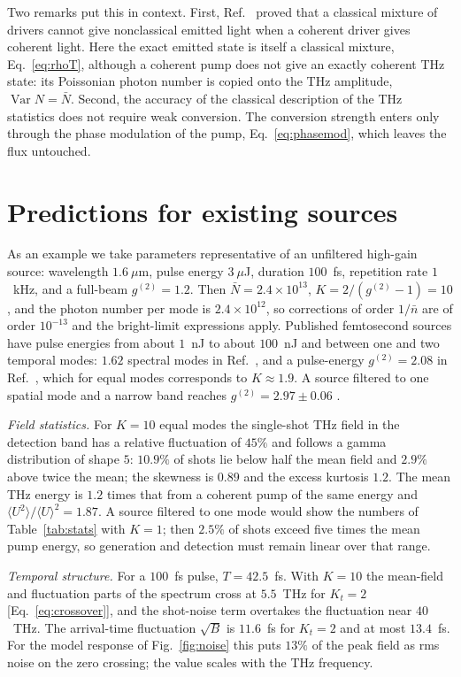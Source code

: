 \documentclass[aps,pra,reprint,superscriptaddress,amsmath,amssymb,floatfix]{revtex4-2}
\newcommand{\nbar}{\bar n}
\newcommand{\Nbar}{\bar N}
\newcommand{\Var}{\operatorname{Var}}
\begin{document}
Two remarks put this in context. First, Ref.~\cite{gothelf2026} proved that a
classical mixture of drivers cannot give nonclassical emitted light when a
coherent driver gives coherent light. Here the exact emitted state is itself
a classical mixture, Eq.~\eqref{eq:rhoT}, although a coherent pump does not
give an exactly coherent THz state: its Poissonian photon number is copied
onto the THz amplitude, $\Var N=\Nbar$. Second, the accuracy of the classical
description of the THz statistics does not require weak conversion. The
conversion strength enters only through the phase modulation of the pump,
Eq.~\eqref{eq:phasemod}, which leaves the flux untouched.

\section{Predictions for existing sources}
\label{sec:predictions}

As an example we take parameters representative of an unfiltered high-gain
source: wavelength $1.6~\mu$m, pulse energy $3~\mu$J, duration $100$~fs,
repetition rate $1$~kHz, and a full-beam $g^{(2)}=1.2$. Then
$\Nbar=2.4\times10^{13}$, $K=2/(g^{(2)}-1)=10$, and the photon number per mode
is $2.4\times10^{12}$, so corrections of order $1/\nbar$ are of order
$10^{-13}$ and the bright-limit expressions apply. Published femtosecond
sources have pulse energies from about $1$~nJ \cite{gholammirzaei2026} to
about $100$~nJ \cite{kern2026} and between one and two temporal modes:
$1.62$ spectral modes in Ref.~\cite{kern2026}, and a pulse-energy
$g^{(2)}=2.08$ in Ref.~\cite{gholammirzaei2026}, which for equal modes
corresponds to $K\approx1.9$. A source filtered to one spatial mode and a
narrow band reaches $g^{(2)}=2.97\pm0.06$ \cite{spasibko2017}.

\emph{Field statistics.} For $K=10$ equal modes the single-shot THz field in
the detection band has a relative fluctuation of $45\%$ and follows a gamma
distribution of shape $5$: $10.9\%$ of shots lie below half the mean field
and $2.9\%$ above twice the mean; the skewness is $0.89$ and the excess
kurtosis $1.2$. The mean THz energy is $1.2$ times that from a coherent pump
of the same energy and $\langle U^2\rangle/\langle U\rangle^2=1.87$. A source
filtered to one mode would show the numbers of Table~\ref{tab:stats} with
$K=1$; then $2.5\%$ of shots exceed five times the mean pump energy, so
generation and detection must remain linear over that range.

\emph{Temporal structure.} For a $100$~fs pulse, $T=42.5$~fs. With $K=10$
the mean-field and fluctuation parts of the spectrum cross at $5.5$~THz for
$K_t=2$ [Eq.~\eqref{eq:crossover}], and the shot-noise term overtakes the
fluctuation near $40$~THz. The arrival-time fluctuation $\sqrt B$ is $11.6$~fs
for $K_t=2$ and at most $13.4$~fs. For the model response of
Fig.~\ref{fig:noise} this puts $13\%$ of the peak field as rms noise on the
zero crossing; the value scales with the THz frequency.
\end{document}
